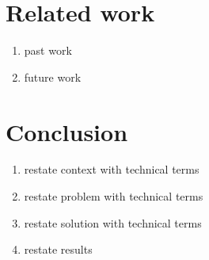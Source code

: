\documentclass[manuscript]{acmart}
\theoremstyle{definition}
\begin{document}
\section{Related work}
\begin{enumerate}
  \item past work 
  \item future work 
\end{enumerate}

\section{Conclusion}
\begin{enumerate}
  \item restate context with technical terms 
  \item restate problem with technical terms 
  \item restate solution with technical terms 
  \item restate results 
\end{enumerate}


\end{document}
